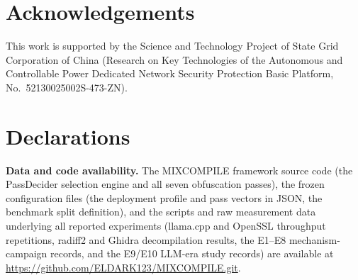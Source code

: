 \documentclass[5p,times,authoryear]{elsarticle}
\theoremstyle{plain}
\theoremstyle{definition}
\theoremstyle{remark}
\begin{document}

\section*{Acknowledgements}

This work is supported by the Science and Technology Project of State Grid
Corporation of China (Research on Key Technologies of the Autonomous and
Controllable Power Dedicated Network Security Protection Basic Platform,
No.~52130025002S-473-ZN).

\section*{Declarations}

\textbf{Data and code availability.} The MIXCOMPILE framework source code (the
PassDecider selection engine and all seven obfuscation passes), the frozen
configuration files (the deployment profile and pass vectors in JSON, the
benchmark split definition), and the scripts and raw measurement data
underlying all reported
experiments (llama.cpp and OpenSSL throughput repetitions, radiff2 and Ghidra
decompilation results, the E1--E8 mechanism-campaign records, and the E9/E10
LLM-era study records) are available at
\url{https://github.com/ELDARK123/MIXCOMPILE.git}.



\end{document}
